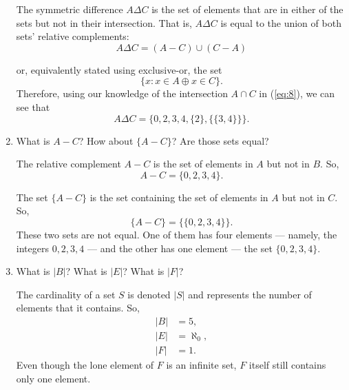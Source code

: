 \documentclass{article}
\renewcommand{\(}{\left(}
\renewcommand{\)}{\right)}
\theoremstyle{plain}
\theoremstyle{plain}
\theoremstyle{definition}
\begin{document}
\begin{enumerate}[label*=\roman*.,ref=\roman*]
\begin{shaded}
The symmetric difference $A \Delta C$ is the set of elements that are in either of the sets but not in their intersection. That is, $A \Delta C$ is equal to the union of both sets' relative complements:
\begin{equation}
A \Delta C = (A - C) \cup (C - A)
\end{equation}

or, equivalently stated using exclusive-or, the set
\begin{equation}
\{x: x \in A \oplus x \in C\}.
\end{equation}
Therefore, using our knowledge of the intersection $A \cap C$ in (\ref{eq:8}), we can see that
\begin{equation}
A \Delta C = \{0, 2, 3, 4, \{2\}, \{
\{3, 4\}\}\}.
\end{equation}
\end{shaded}

\item What is $A - C$? How about $\{A - C\}$? Are those sets equal?

\begin{shaded}
The relative complement $A - C$ is the set of elements in $A$ but not in $B$. So,
\begin{equation}
A - C = \{0, 2, 3, 4\}.
\end{equation}

The set $\{A - C\}$ is the set containing the set of elements in $A$ but not in $C$. So,
\begin{equation}
\{A - C\} = \{\{0, 2, 3, 4\}\}.
\end{equation}
These two sets are not equal. One of them has four elements --- namely, the integers $0, 2, 3, 4$ --- and the other has one element --- the set $\{0, 2, 3, 4\}$.
\end{shaded}

\item What is $|B|$? What is $|E|$? What is $|F|$?

\begin{shaded}
The cardinality of a set $S$ is denoted $|S|$ and represents the number of elements that it contains. So,
\begin{align}
|B| & = 5, \\
|E| & = \aleph_0, \\
|F| & = 1.
\end{align}
Even though the lone element of $F$ is an infinite set, $F$ itself still contains only one element.
\end{shaded}


\end{enumerate}
\end{document}
